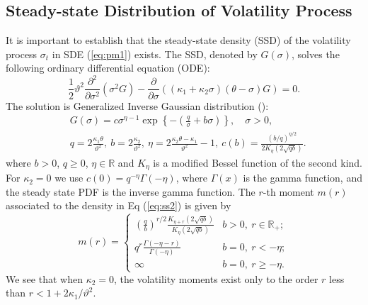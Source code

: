 \documentclass[pdftex,11pt,a4paper] {article}
\begin{document}
 

\subsection{Steady-state Distribution of Volatility Process}\label{sec:steady_state}

It is important to establish that the steady-state density (SSD) of the volatility process $\sigma_{t}$ in SDE (\ref{eq:pm1}) exists. The SSD, denoted by $G(\sigma)$, solves the following ordinary differential equation (ODE):
\begin{equation} \label {eq:ss1}
\frac{1}{2}\vartheta^{2}\frac{\partial^2}{\partial\sigma^2}\left(\sigma^{2}G\right) - \frac{\partial}{\partial\sigma}\left((\kappa_{1} + \kappa_2\sigma)(\theta - \sigma)G\right)=0.
\end{equation}
The solution is Generalized Inverse Gaussian distribution (\cite{Jorgensen1982}):
\begin{equation} \label{eq:ss2}
\begin{split}
& G(\sigma) = c \sigma^{\eta-1} \exp\left\{ -\left(\frac{q}{\sigma} +b\sigma \right)\right\},\quad \sigma>0,\\
&q = 2\frac{\kappa_1\theta}{\vartheta^2}, \ b = 2\frac{\kappa_2}{\vartheta^2},\  \eta = 2\frac{\kappa_{2}\theta-\kappa_{1}}{\vartheta^{2}}-1, \ c(b) =\frac{\left(b/q\right)^{\eta/2}}{2K_{\eta}\left(2\sqrt{qb}\right)}.
\end{split}
\end{equation}
where $b>0$, $q\ge 0$, $\eta\in\mathbb{R}$ and $K_{\eta}$ is a modified Bessel function of the second kind. For $\kappa_{2}=0$ we use $c(0)=q^{-\eta}\Gamma(-\eta)$, where $\Gamma(x)$ is the gamma function, and the steady state PDF is the inverse gamma function. The $r$-th moment $m(r)$ associated to the density in Eq (\ref{eq:ss2}) is given by
\begin{equation} \label{eq:ss3}
m(r)= \begin{cases} 
      \left(\frac{q}{b}\right)^{r/2}\frac{K_{\eta+r}\left(2\sqrt{qb}\right)}{K_{\eta}\left(2\sqrt{qb}\right)} & b>0, \ r \in \mathbb{R}_{+}; \\
      q^{r}\frac{\Gamma(-\eta-r)}{\Gamma(-\eta)} & b = 0, \ r < -\eta; \\
      \infty & b = 0, \ r \geq -\eta.
   \end{cases}
\end{equation}
We see that when $\kappa_2=0$, the volatility moments exist only to the order $r$ less than $r<1+2\kappa_{1}/\vartheta^{2}$.
\end{document}
